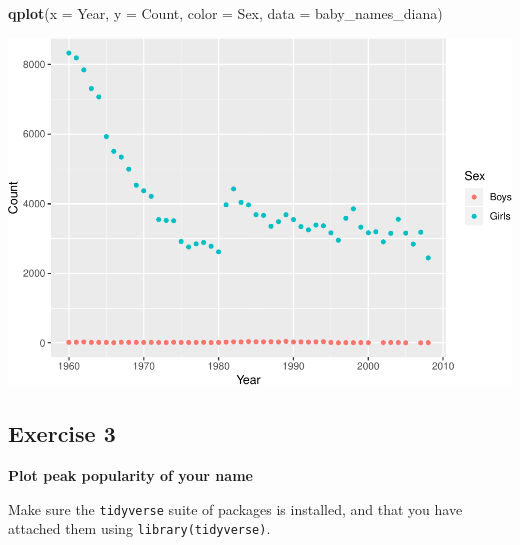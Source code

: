\documentclass[]{book}
\newenvironment{Shaded}{\begin{snugshade}}{\end{snugshade}}
\newcommand{\KeywordTok}[1]{\textcolor[rgb]{0.13,0.29,0.53}{\textbf{#1}}}
\newcommand{\DataTypeTok}[1]{\textcolor[rgb]{0.13,0.29,0.53}{#1}}
\newcommand{\NormalTok}[1]{#1}
\begin{document}
\begin{Shaded}
\begin{Highlighting}[]
\KeywordTok{qplot}\NormalTok{(}\DataTypeTok{x =}\NormalTok{ Year, }\DataTypeTok{y =}\NormalTok{ Count, }\DataTypeTok{color =}\NormalTok{ Sex,}
      \DataTypeTok{data =}\NormalTok{ baby_names_diana)}
\end{Highlighting}
\end{Shaded}

\includegraphics{R/Rintro/figures/unnamed-chunk-34-1.pdf}

\subsection{Exercise 3}\label{exercise-3}

\textbf{Plot peak popularity of your name}

Make sure the \texttt{tidyverse} suite of packages is installed, and
that you have attached them using \texttt{library(tidyverse)}.
\end{document}
